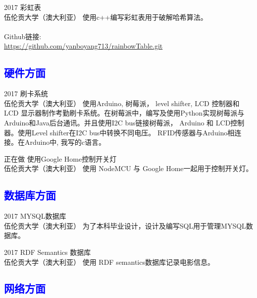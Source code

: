 \documentclass[]{friggeri-cv}
\begin{document}
\begin{entrylist}
  \entry
    {2017}
    {彩虹表\\}
    {伍伦贡大学（澳大利亚）}
    {使用c++编写彩虹表用于破解哈希算法。
    \\\\ Github链接: \\{\small\url{https://github.com/yanboyang713/rainbowTable.git}}}
\end{entrylist}

\subsection*{\textcolor{blue}{硬件方面}}

\begin{entrylist}
  \entry
    {2017}
    {刷卡系统\\}
    {伍伦贡大学（澳大利亚）}
    {使用Arduino, 树莓派， level shifter, LCD 控制器和 LCD 显示器制作考勤刷卡系统。在树莓派中，编写及使用Python实现树莓派与Arduino和Java后台通讯。并且使用I2C bus链接树莓派， Arduino 和 LCD控制器。使用Level shifter在I2C bus中转换不同电压。 RFID传感器与Arduino相连接。在Arduino中, 我写的c语言。}
\end{entrylist}

\begin{entrylist}
  \entry
    {正在做}
    {使用Google Home控制开关灯\\}
    {伍伦贡大学（澳大利亚）}
    {使用 NodeMCU 与 Google Home一起用于控制开关灯。}
\end{entrylist}

\subsection*{\textcolor{blue}{数据库方面}}

\begin{entrylist}
  \entry
    {2017}
    {MYSQL数据库\\}
    {伍伦贡大学（澳大利亚）}
    {为了本科毕业设计，设计及编写SQL用于管理MYSQL数据库。}
\end{entrylist}

\begin{entrylist}
  \entry
    {2017}
    {RDF Semantics 数据库\\}
    {伍伦贡大学（澳大利亚）}
    {使用 RDF semantics数据库记录电影信息。}
\end{entrylist}

\subsection*{\textcolor{blue}{网络方面}}
\end{document}
